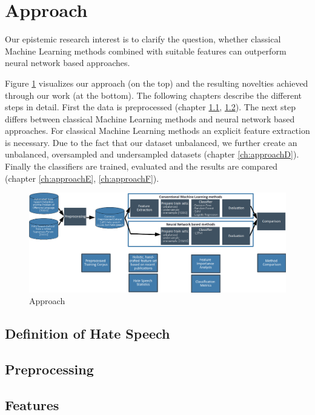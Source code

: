 \section{Approach} 
\label{approach}

Our epistemic research interest is to clarify the question, whether classical Machine Learning methods combined with suitable features can outperform neural network based approaches.

Figure \ref{fig:overall_pipeline} visualizes our approach (on the top) and the resulting novelties achieved through our work (at the bottom). The following chapters describe the different steps in detail. First the data is preprocessed (chapter \ref{ch:approachA}, \ref{ch:approachB}). 
The next step differs between classical Machine Learning methods and neural network based approaches. For classical Machine Learning methods an explicit feature extraction is necessary. Due to the fact that our dataset unbalanced, we further create an unbalanced, oversampled and undersampled datasets (chapter \ref{ch:approachD}). Finally the classifiers are trained, evaluated and the results are compared (chapter \ref{ch:approachE}, \ref{ch:approachF}). 

\begin{figure}[ht]
	\centering
	\includegraphics[width=1.0\linewidth]{figures/pipeline.png}
	\caption{Approach}
	\label{fig:overall_pipeline}
\end{figure}

\subsection{Definition of Hate Speech} 
\label{ch:approachA}

\subsection{Preprocessing}
\label{ch:approachB}

\subsection{Features}
\label{ch:approachC}

